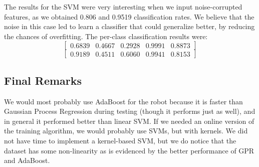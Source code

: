 \documentclass[letterpaper]{article}
\begin{document}
The results for the SVM were very interesting when we input
noise-corrupted features, as we obtained 0.806 and 0.9519
classification rates. We believe that the noise in this case led to
learn a classifier that could generalize better, by reducing the
chances of overfitting. The per-class classification results were:
$$\begin{bmatrix} 0.6839  &  0.4667  &  0.2928  &  0.9991  &  0.8873\end{bmatrix}$$
$$\begin{bmatrix} 0.9189   & 0.4511   & 0.6060    & 0.9941   & 0.8153\end{bmatrix}$$

\subsection*{Final Remarks}

We would most probably use AdaBoost for the robot because it is faster
than Gaussian Process Regression during testing (though it performs
just as well), and in general it performed better than linear SVM. If we
needed an online version of the training algorithm, we would probably
use SVMs, but with kernels. We did not have time to implement a
kernel-based SVM, but we do notice that the dataset has some non-linearity
as is evidenced by the better performance of GPR and AdaBoost.
\end{document}
